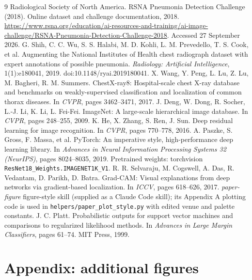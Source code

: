 \documentclass[11pt,a4paper]{article}
\begin{document}
\clearpage
\begin{thebibliography}{9}\small
\setlength{\itemsep}{0pt}
 Radiological Society of North America. RSNA Pneumonia Detection Challenge (2018). Online dataset and
challenge documentation, 2018. \url{https://www.rsna.org/education/ai-resources-and-training/ai-image-challenge/RSNA-Pneumonia-Detection-Challenge-2018}. Accessed 27 September 2026.
 G. Shih, C. C. Wu, S. S. Halabi, M. D. Kohli, L. M. Prevedello, T. S. Cook, et al. Augmenting the
National Institutes of Health chest radiograph dataset with expert annotations of possible pneumonia.
\emph{Radiology: Artificial Intelligence}, 1(1):e180041, 2019. doi:10.1148/ryai.2019180041.
 X. Wang, Y. Peng, L. Lu, Z. Lu, M. Bagheri, R. M. Summers. ChestX-ray8: Hospital-scale chest X-ray
database and benchmarks on weakly-supervised classification and localization of common thorax diseases. In
\emph{CVPR}, pages 3462--3471, 2017.
 J. Deng, W. Dong, R. Socher, L.-J. Li, K. Li, L. Fei-Fei. ImageNet: A large-scale hierarchical image
database. In \emph{CVPR}, pages 248--255, 2009.
 K. He, X. Zhang, S. Ren, J. Sun. Deep residual learning for image recognition. In \emph{CVPR}, pages 770--778, 2016.
 A. Paszke, S. Gross, F. Massa, et al. PyTorch: An imperative style, high-performance deep learning
library. In \emph{Advances in Neural Information Processing Systems 32 (NeurIPS)}, pages 8024--8035, 2019. Pretrained weights: torchvision \texttt{ResNet18\_Weights.IMAGENET1K\_V1}.
 R. R. Selvaraju, M. Cogswell, A. Das, R. Vedantam, D. Parikh, D. Batra. Grad-CAM: Visual
explanations from deep networks via gradient-based localization. In \emph{ICCV}, pages 618--626, 2017.
 \emph{paper-figure} figure-style skill (supplied as a Claude Code skill); its Appendix A plotting code
is used in \texttt{helpers/paper\_plot\_style.py} with edited venue and palette constants.
 J. C. Platt. Probabilistic outputs for support vector machines and comparisons to regularized likelihood methods. In \emph{Advances in Large Margin Classifiers}, pages 61--74. MIT Press, 1999.
\end{thebibliography}

\clearpage
\appendix
\section*{Appendix: additional figures}
\renewcommand{\thefigure}{A\arabic{figure}}
\setcounter{figure}{0}
\end{document}
